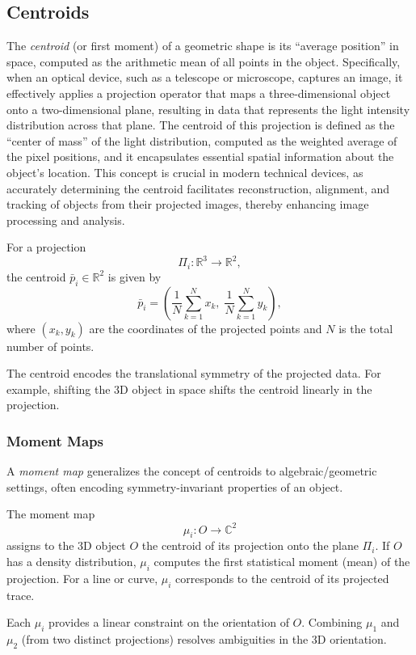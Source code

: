 \documentclass[runningheads]{llncs}
\begin{document}
\subsection{Centroids}

The \emph{centroid} (or first moment) of a geometric shape is its ``average position'' in space, computed as the arithmetic mean of all points in the object. Specifically, when an optical device, such as a telescope or microscope, captures an image, it effectively applies a projection operator that maps a three-dimensional object onto a two-dimensional plane, resulting in data that represents the light intensity distribution across that plane. The centroid of this projection is defined as the ``center of mass'' of the light distribution, computed as the weighted average of the pixel positions, and it encapsulates essential spatial information about the object’s location. This concept is crucial in modern technical devices, as accurately determining the centroid facilitates reconstruction, alignment, and tracking of objects from their projected images, thereby enhancing image processing and analysis.

For a projection 
\[
\Pi_i: \mathbb{R}^3 \to \mathbb{R}^2,
\]
the centroid \(\bar{p}_i \in \mathbb{R}^2\) is given by
\[
\bar{p}_i = \left( \frac{1}{N}\sum_{k=1}^{N} x_k, \; \frac{1}{N}\sum_{k=1}^{N} y_k \right),
\]
where \((x_k,y_k)\) are the coordinates of the projected points and \(N\) is the total number of points.

The centroid encodes the translational symmetry of the projected data. For example, shifting the 3D object in space shifts the centroid linearly in the projection.




\subsubsection{Moment Maps}
A \emph{moment map} generalizes the concept of centroids to algebraic/geometric settings, often encoding symmetry-invariant properties of an object.

The moment map 
\[
\mu_i: O \to \mathbb{C}^2
\]
assigns to the 3D object \(O\) the centroid of its projection onto the plane \(\Pi_i\). If \(O\) has a density distribution, \(\mu_i\) computes the first statistical moment (mean) of the projection. For a line or curve, \(\mu_i\) corresponds to the centroid of its projected trace.

Each \(\mu_i\) provides a linear constraint on the orientation of \(O\). Combining \(\mu_1\) and \(\mu_2\) (from two distinct projections) resolves ambiguities in the 3D orientation.
\end{document}
